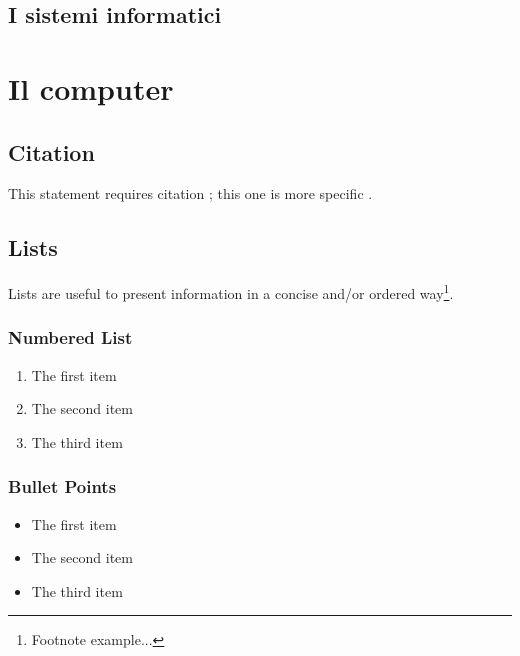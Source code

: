 \documentclass[11pt,fleqn,a5paper]{book} %
\begin{document}
    		
    		\section{I sistemi informatici}
    		\label{sec: I sistemi informatici}
    		
    	\chapter{Il computer}
    	\label{cap: Il computer}
    		
    			
        
    
        \section{Citation}
    
        This statement requires citation \cite{book_key}; this one is more specific \cite[122]{article_key}.
    
    
    \section{Lists}
    
    Lists are useful to present information in a concise and/or ordered way\footnote{Footnote example...}.
    
    \subsection{Numbered List}
    
    \begin{enumerate}
    \item The first item
    \item The second item
    \item The third item
    \end{enumerate}
    
    \subsection{Bullet Points}
    
    \begin{itemize}
    \item The first item
    \item The second item
    \item The third item
    \end{itemize}
    
\end{document}
